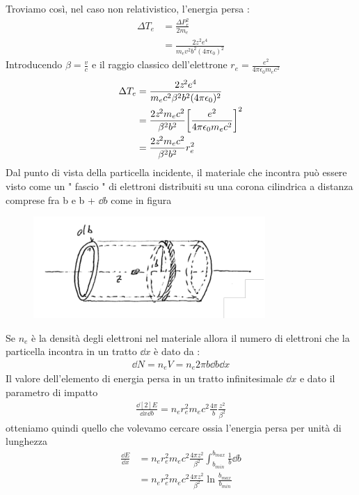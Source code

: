 Troviamo così, nel caso non relativistico, l'energia persa : 
\begin{align*}
        \Delta T_{e} &= \frac{\Delta P_{e}^2}{2m_{e}} \\ 
                     &=\frac{2\textit{z}^2e^4}{m_{e}v^2b^2(4\pi\epsilon_{0})^2} 
\end{align*}
Introducendo $\beta = \frac{v}{c}$ e il raggio classico dell'elettrone $r_{e} = \frac{e^2}{4\pi\epsilon_{0}m_{e}c^2}$
\begin{align*}
        \Delta T_{e} &=  \frac{2\textit{z}^2e^4}{m_{e}c^2\beta^2b^2(4\pi\epsilon_{0})^2} \\
                     &= \frac{2\textit{z}^2m_{e}c^2}{\beta^2b^2}\qty[\frac{e^2}{4\pi\epsilon_{0}m_{e}c^2}]^2 \\
                     &= \frac{2\textit{z}^2m_{e}c^2}{\beta^2b^2}r_{e}^2
\end{align*}
\newpage
Dal punto di vista della particella incidente, il materiale che incontra può essere visto come un " fascio "
di elettroni distribuiti su una corona cilindrica a distanza comprese fra b e b + $\dd{b}$ come in figura
\begin{figure}[!h]
    \centering
    \includegraphics[scale=0.5]{ch6InterazioneMateria/DistribuzioneElettroni}
\end{figure}
Se $n_{e}$ è la densità degli elettroni nel materiale allora il numero di elettroni che 
la particella incontra in un tratto $\dd{x}$ è dato da : 
\begin{align*}
    \dd{N} = n_{e}V = n_{e}2\pi b\dd{b}\dd{x}
\end{align*}
Il valore dell'elemento di energia persa in un tratto infinitesimale $\dd{x}$ e dato il parametro di impatto 
\begin{align*}
    \frac{\dd[2]{E}}{\dd{x}\dd{b}} = n_{e}r_{e}^2m_{e}c^2\frac{4\pi}{b}\frac{z^2}{\beta^2}
\end{align*}
otteniamo quindi quello che volevamo cercare ossia l'energia persa per unità di lunghezza
\begin{align*}
        \frac{\dd{E}}{\dd{x}} &= n_{e}r_{e}^2m_{e}c^2\frac{4\pi z^2}{\beta^2}\int_{b_{min}}^{b_{max}}\frac{1}{b}\dd{b} \\[1em]
                              &= n_{e}r_{e}^2m_{e}c^2\frac{4\pi z^2}{\beta^2}\ln{\frac{b_{max}}{b_{min}}}
\end{align*}
